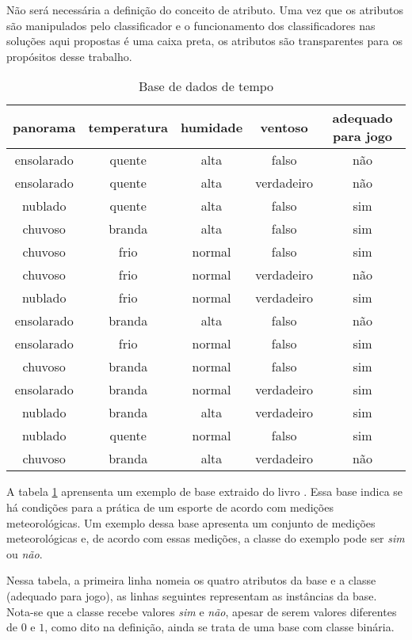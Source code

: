Não será necessária a definição do conceito de atributo. Uma vez que os atributos são manipulados pelo classificador e o funcionamento dos classificadores nas soluções aqui propostas é uma caixa preta, os atributos são transparentes para os propósitos desse trabalho.

\begin{table}[h!]
    \centering
    \begin{tabular}{ccccc}
        \hline
        panorama & temperatura & humidade & ventoso & adequado para jogo \\
        \hline
        ensolarado & quente & alta & falso & não \\
        ensolarado & quente & alta & verdadeiro & não \\
        nublado & quente & alta & falso & sim \\
        chuvoso & branda & alta & falso & sim \\
        chuvoso & frio & normal & falso & sim \\
        chuvoso & frio & normal & verdadeiro & não \\
        nublado & frio & normal & verdadeiro & sim \\
        ensolarado & branda & alta & falso & não \\
        ensolarado & frio & normal & falso & sim \\
        chuvoso & branda & normal & falso & sim \\
        ensolarado & branda & normal & verdadeiro & sim \\
        nublado & branda & alta & verdadeiro & sim \\
        nublado & quente & normal & falso & sim \\
        chuvoso & branda & alta & verdadeiro & não \\
        \hline
    \end{tabular}

    \label{tbl:weather_data}
    \caption{Base de dados de tempo}
\end{table}

A tabela \ref{tbl:weather_data} aprensenta um exemplo de base extraido do livro \cite{wekabook}. Essa base indica se há condições para a prática de um esporte de acordo com medições meteorológicas. Um exemplo dessa base apresenta um conjunto de medições meteorológicas e, de acordo com essas medições, a classe do exemplo pode ser \emph{sim} ou \emph{não}.

Nessa tabela, a primeira linha nomeia os quatro atributos da base e a classe (adequado para jogo), as linhas seguintes representam as instâncias da base. Nota-se que a classe recebe valores \emph{sim} e \emph{não}, apesar de serem valores diferentes de $0$ e $1$, como dito na definição, ainda se trata de uma base com classe binária.

